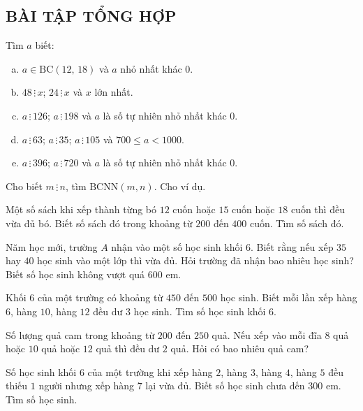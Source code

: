 \begin{bt}
\subsection{BÀI TẬP TỔNG HỢP}
\end{bt}   \begin{bt}
Tìm $a$ biết:
\begin{enumerate}[a)]
\item $a \in \text{BC}\left( {12,\,18} \right)$ và $a$ nhỏ nhất khác $0$.
\item $48\, \vdots \, x$; $24 \,\vdots \,x$ và $x$ lớn nhất.
\item $a \,\vdots\,  126$; $a\, \vdots \,198$ và $a$ là số tự nhiên nhỏ nhất khác $0$.
\item $a \,\vdots \, 63$; $a \,\vdots \,35$; $a \,\vdots \,105$ và $700 \le a < 1000$.
\item $a \,\vdots  \,396$; $a\, \vdots \,720$ và $a$ là số tự nhiên nhỏ nhất khác $0$.
\end{enumerate}
\end{bt}   \begin{bt}  
Cho biết $m\, \vdots \, n$, tìm $\text{BCNN}\left( {m,n} \right)$. Cho ví dụ.
\end{bt}   \begin{bt}
Một số sách khi xếp thành từng bó $12$ cuốn hoặc $15$ cuốn hoặc $18$ cuốn thì đều vừa đủ bó. Biết số sách đó trong khoảng từ $200$ đến $400$ cuốn. Tìm số sách đó.
\end{bt}   \begin{bt}
Năm học mới, trường $A$ nhận vào một số học sinh khối $6$. Biết rằng nếu xếp $35$ hay $40$ học sinh vào một lớp thì vừa đủ. Hỏi trường đã nhận bao nhiêu học sinh? Biết số học sinh không vượt quá $600$ em.
\end{bt}   \begin{bt}
Khối $6$ của một trường có khoảng từ $450$ đến $500$ học sinh. Biết mỗi lần xếp hàng $6$, hàng $10$, hàng $12$ đều dư $3$ học sinh. Tìm số học sinh khối $6$.
\end{bt}   \begin{bt}
Số lượng quả cam trong khoảng từ $200$ đến $250$ quả. Nếu xếp vào mỗi đĩa $8$ quả hoặc $10$ quả hoặc $12$ quả thì đều dư $2$ quả. Hỏi có bao nhiêu quả cam?
\end{bt}   \begin{bt}
Số học sinh khối $6$ của một trường khi xếp hàng $2$, hàng $3$, hàng $4$, hàng $5$ đều thiếu $1$ người nhưng xếp hàng $7$ lại vừa đủ. Biết số học sinh chưa đến $300$ em. Tìm số học sinh.
\end{bt}   \begin{bt}

\end{bt}
